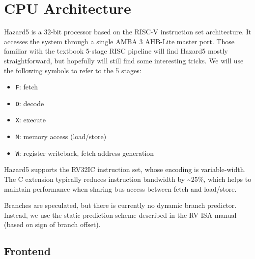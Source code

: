 \documentclass[notitlepage]{article}
\begin{document}
\section{CPU Architecture}

Hazard5 is a 32-bit processor based on the RISC-V instruction set architecture. It accesses the system through a single AMBA 3 AHB-Lite master port. Those familiar with the textbook 5-stage RISC pipeline will find Hazard5 mostly straightforward, but hopefully will still find some interesting tricks. We will use the following symbols to refer to the 5 stages:

\begin{itemize}
\item \texttt{F}: fetch
\item \texttt{D}: decode
\item \texttt{X}: execute
\item \texttt{M}: memory access (load/store)
\item \texttt{W}: register writeback, fetch address generation
\end{itemize}


Hazard5 supports the RV32IC instruction set, whose encoding is variable-width. The C extension typically reduces instruction bandwidth by \textasciitilde 25\%, which helps to maintain performance when sharing bus access between fetch and load/store.

Branches are speculated, but there is currently no dynamic branch predictor. Instead, we use the static prediction scheme described in the RV ISA manual (based on sign of branch offset).




\subsection{Frontend}
\label{section:frontend}
\end{document}
